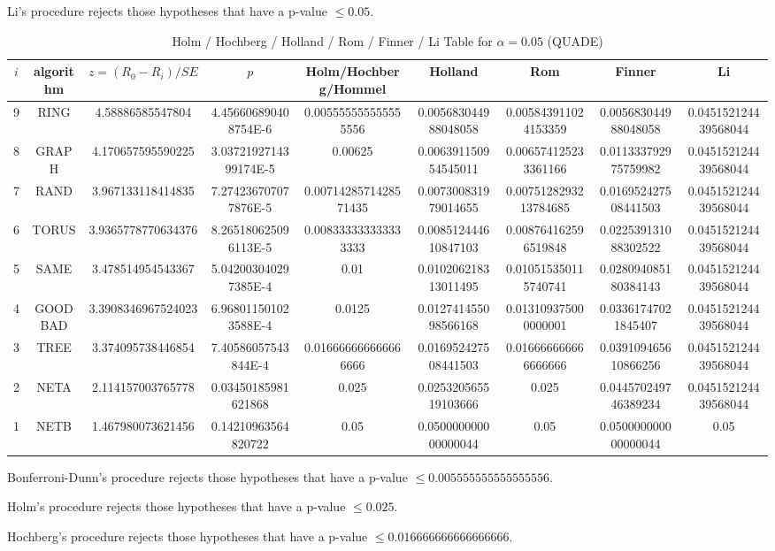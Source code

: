 \documentclass[a4paper,10pt]{article}
\begin{document}
\begin{landscape}
Li's procedure rejects those hypotheses that have a p-value $\le0.05$.



\newpage

\begin{table}[!htp]
\centering\scriptsize
\caption{Holm / Hochberg / Holland / Rom / Finner / Li Table for $\alpha=0.05$ (QUADE)}
\begin{tabular}{ccccccccc}
$i$&algorithm&$z=(R_0 - R_i)/SE$&$p$&Holm/Hochberg/Hommel&Holland&Rom&Finner&Li\\
\hline
9& RING&4.58886585547804&4.456606890408754E-6&0.005555555555555556&0.005683044988048058&0.005843911024153359&0.005683044988048058&0.045152124439568044\\
8& GRAPH&4.170657595590225&3.0372192714399174E-5&0.00625&0.006391150954545011&0.006574125233361166&0.011333792975759982&0.045152124439568044\\
7& RAND&3.967133118414835&7.274236707077876E-5&0.0071428571428571435&0.007300831979014655&0.0075128293213784685&0.016952427508441503&0.045152124439568044\\
6& TORUS&3.9365778770634376&8.265180625096113E-5&0.008333333333333333&0.008512444610847103&0.008764162596519848&0.022539131088302522&0.045152124439568044\\
5& SAME&3.478514954543367&5.042003040297385E-4&0.01&0.010206218313011495&0.010515350115740741&0.028094085180384143&0.045152124439568044\\
4& GOODBAD&3.3908346967524023&6.968011501023588E-4&0.0125&0.012741455098566168&0.013109375000000001&0.03361747021845407&0.045152124439568044\\
3& TREE&3.374095738446854&7.40586057543844E-4&0.016666666666666666&0.016952427508441503&0.016666666666666666&0.039109465610866256&0.045152124439568044\\
2& NETA&2.114157003765778&0.03450185981621868&0.025&0.025320565519103666&0.025&0.044570249746389234&0.045152124439568044\\
1& NETB&1.467980073621456&0.14210963564820722&0.05&0.050000000000000044&0.05&0.050000000000000044&0.05\\
\hline
\end{tabular}
\end{table}
Bonferroni-Dunn's procedure rejects those hypotheses that have a p-value $\le0.005555555555555556$.


Holm's procedure rejects those hypotheses that have a p-value $\le0.025$.


Hochberg's procedure rejects those hypotheses that have a p-value $\le0.016666666666666666$.



\end{landscape}
\end{document}
